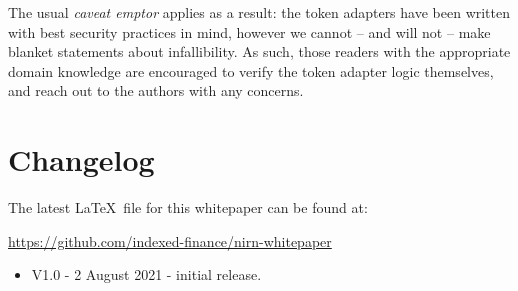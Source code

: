\documentclass{article}
\begin{document}
\noindent
The usual \textit{caveat emptor} applies as a result: the token adapters have been written with best security practices in mind, however we cannot -- and will not -- make blanket statements about infallibility. As such, those readers with the appropriate domain knowledge are encouraged to verify the token adapter logic themselves, and reach out to the authors with any concerns.

\newpage
\section{Changelog}

The latest \LaTeX~file for this whitepaper can be found at:

\begin{center}
\url{https://github.com/indexed-finance/nirn-whitepaper}
\end{center}

\begin{itemize}
    \item V1.0 - 2 August 2021 - initial release.
\end{itemize}
\end{document}
